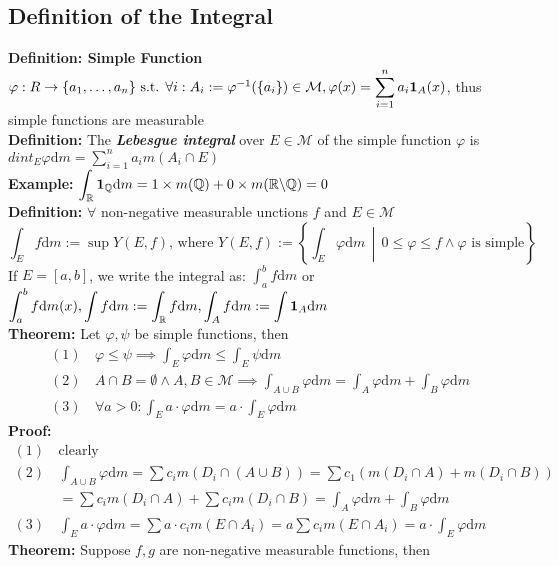 \documentclass{article}
\newcommand{\R}{\mathbb{R}}
\newcommand{\Q}{\mathbb{Q}}
\newcommand{\sumin}{\displaystyle\sum_{i=1}^n}
\newcommand{\bcsl}{\symbol{92}}
\newcommand{\st}{\mbox{ s.t. }}
\newcommand{\0}{{\bf{0}}}
\newcommand{\1}{{\bf{1}}}
\newcommand{\dint}{\displaystyle\int}
\newcommand{\dif}{\mbox{d}}
\begin{document}
\subsection{Definition of the Integral}
\textbf{Definition: Simple Function}\\
$\varphi:R\to\{a_1,\dots,a_n\}\st\forall i:A_i:=\varphi^{-1}(\{a_i\})\in\mathcal{M},\varphi(x)=\sumin a_i\1_A(x)$, thus simple functions are measurable\\
\textbf{Definition:} The \textit{\textbf{Lebesgue integral}} over $E\in\mathcal{M}$ of the simple function $\varphi$ is $dint_E\varphi \dif m=\sumin a_im(A_i\cap E)$\\
\textbf{Example:} $\dint_\R\1_\Q \dif m=1\times m(\Q)+0\times m(\R\bcsl\Q)=0$\\
\textbf{Definition:} $\forall$ non-negative measurable unctions $f$ and $E\in\mathcal{M}$
$$\dint_Ef\dif m:=\sup Y(E,f)\mbox{, where }Y(E,f):=\left\{\dint_E\varphi \dif m\,\middle\vert\,0\le\varphi\le f\land\varphi\mbox{ is simple}\right\}$$
If $E=[a,b]$, we write the integral as: $\dint_a^b f\dif m$ or $\dint_a^b f\dif m(x),\dint f\dif m:=\dint_\R f\dif m,\dint_A f\dif m:=\dint\1_A\dif m$\\
\textbf{Theorem:} Let $\varphi,\psi$ be simple functions, then
\begin{equation}
\begin{split}
    (1)\,&\varphi\le\psi\implies\int_E\varphi \dif m\le\int_E\psi \dif m\\
    (2)\,&A\cap B=\emptyset\land A,B\in\mathcal{M}\implies\int_{A\cup B}\varphi \dif m=\int_A\varphi \dif m+\int_B\varphi \dif m\\
    (3)\,&\forall a>0:\int_Ea\cdot\varphi \dif m=a\cdot\int_E\varphi \dif m
\end{split}
\end{equation}
\textbf{Proof:}
\begin{equation}
\begin{split}
    (1)\,&\mbox{clearly}\\
    (2)\,&\int_{A\cup B}\varphi \dif m=\sum c_im(D_i\cap(A\cup B))=\sum c_1(m(D_i\cap A)+m(D_i\cap B))\\
    &=\sum c_im(D_i\cap A)+\sum c_im(D_i\cap B)=\int_A\varphi \dif m+\int_B\varphi \dif m\\
    (3)\,&\int_Ea\cdot\varphi \dif m=\sum a\cdot c_im(E\cap A_i)=a\sum c_im(E\cap A_i)=a\cdot\int_E\varphi \dif m
\end{split}
\end{equation}
\textbf{Theorem:} Suppose $f,g$ are non-negative measurable functions, then
\end{document}
